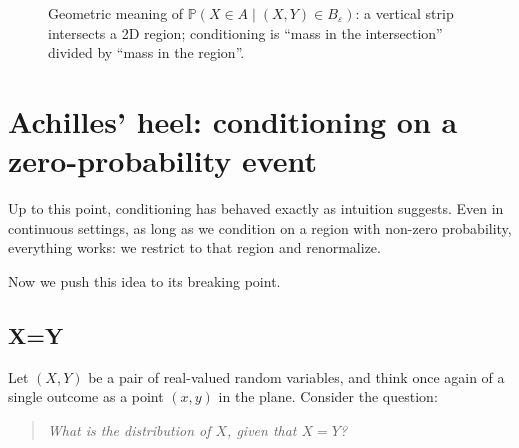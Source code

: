 \documentclass[11pt]{article}
\theoremstyle{remark}
\begin{document}
\begin{figure}[h!]
\centering
{}
\caption{Geometric meaning of \(\mathbb{P}(X\in A \mid (X,Y)\in B_\varepsilon)\):
a vertical strip intersects a 2D region; conditioning is ``mass in the intersection''
divided by ``mass in the region''.}
\end{figure}


\section{Achilles' heel: conditioning on a zero-probability event}

Up to this point, conditioning has behaved exactly as intuition suggests.
Even in continuous settings, as long as we condition on a region with
non-zero probability, everything works:
we restrict to that region and renormalize.

Now we push this idea to its breaking point.

\subsection{X=Y}

Let \((X,Y)\) be a pair of real-valued random variables, and think once again
of a single outcome as a point \((x,y)\) in the plane.
Consider the question:
\begin{quote}
\emph{What is the distribution of \(X\), given that \(X=Y\)?}
\end{quote}
\end{document}
